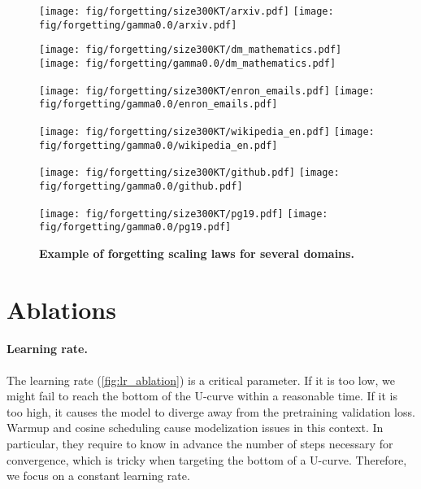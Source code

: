 \begin{figure*}%
    \centering
    \begin{minipage}{0.49\textwidth}
        \texttt{[image: fig/forgetting/size300KT/arxiv.pdf]}
        \texttt{[image: fig/forgetting/gamma0.0/arxiv.pdf]}
    \end{minipage}
    \begin{minipage}{0.49\textwidth}
        \texttt{[image: fig/forgetting/size300KT/dm\_mathematics.pdf]}
        \texttt{[image: fig/forgetting/gamma0.0/dm\_mathematics.pdf]}
    \end{minipage}
    \begin{minipage}{0.49\textwidth}
        \texttt{[image: fig/forgetting/size300KT/enron\_emails.pdf]}
        \texttt{[image: fig/forgetting/gamma0.0/enron\_emails.pdf]}
    \end{minipage}
    \begin{minipage}{0.49\textwidth}%
        \texttt{[image: fig/forgetting/size300KT/wikipedia\_en.pdf]}
        \texttt{[image: fig/forgetting/gamma0.0/wikipedia\_en.pdf]}
    \end{minipage}
    \begin{minipage}{0.49\textwidth}
        \texttt{[image: fig/forgetting/size300KT/github.pdf]}
        \texttt{[image: fig/forgetting/gamma0.0/github.pdf]}
    \end{minipage}
    \begin{minipage}{0.49\textwidth}
        \texttt{[image: fig/forgetting/size300KT/pg19.pdf]}
        \texttt{[image: fig/forgetting/gamma0.0/pg19.pdf]}
    \end{minipage}
    \caption{\textbf{Example of forgetting scaling laws for several domains.}}
    \label{fig:forgettinggrid}
\end{figure*}

\section{Ablations}

\paragraph{Learning rate.} The learning rate (\autoref{fig:lr_ablation}) is a critical parameter. If it is too low, we might fail to reach the bottom of the U-curve within a reasonable time. If it is too high, it causes the model to diverge away from the pretraining validation loss. Warmup and cosine scheduling cause modelization issues in this context. In particular, they require to know in advance the number of steps necessary for convergence, which is tricky when targeting the bottom of a U-curve. Therefore, we focus on a constant learning rate.   

